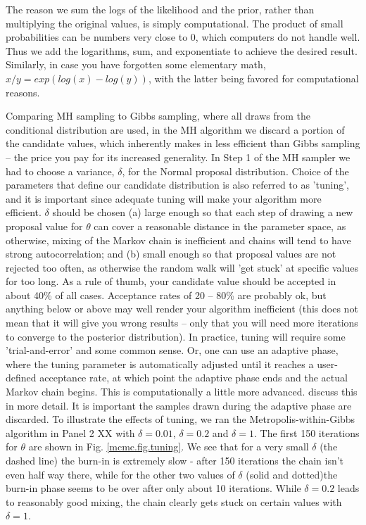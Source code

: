 The reason we sum the logs of the likelihood and the prior, rather than multiplying the original values, is simply computational. The product of small probabilities can be numbers very close to 0, which computers do not handle well. Thus we add the logarithms, sum, and exponentiate to achieve the desired result. Similarly, in case you have forgotten some elementary math, $x/y = exp(log(x)-log(y))$, with the latter being favored for computational reasons.

Comparing MH sampling to Gibbs sampling, where all draws from the conditional distribution are used, in the MH algorithm we discard a portion of the candidate values, which inherently makes in less efficient than Gibbs sampling – the price you pay for its increased generality.
In Step 1 of the MH sampler we had to choose a variance, $\delta$, for the Normal proposal distribution. Choice of the parameters that define our candidate distribution is also referred to as 'tuning', and it is important since adequate tuning will make your algorithm more efficient. 
$\delta$ should be chosen (a) large enough so that each step of drawing a new proposal value for $\theta$ can cover a reasonable distance in the parameter space, as otherwise, mixing of the Markov chain is inefficient and chains will tend to have strong autocorrelation; and (b) small enough so that proposal values are not rejected too often, as otherwise the random walk will 'get stuck' at specific values for too long.  As a rule of thumb, your candidate value should be accepted in about 40\% of all cases. Acceptance rates of 20 -- 80\% are probably ok, but anything below or above may well render your algorithm inefficient (this does not mean that it will give you wrong results – only that you will need more iterations to converge to the posterior distribution). In practice, tuning will require some 'trial-and-error' and some common sense. Or, one can use an adaptive phase, where the tuning parameter is automatically adjusted until it reaches a user-defined acceptance rate, at which point the adaptive phase ends and the actual Markov chain begins. This is computationally a little more advanced. \citet{link_barker:2009} discuss this in more detail. It is important the samples drawn during the adaptive phase are discarded.
To illustrate the effects of tuning, we ran the Metropolis-within-Gibbs algorithm in Panel 2 XX with $\delta=0.01$, $\delta=0.2$ and $\delta=1$. The first 150 iterations for $\theta$ are shown in Fig. \ref{mcmc.fig.tuning}. We see that for a very small $\delta$ (the dashed line) the burn-in is extremely slow - after 150 iterations the chain isn't even half way there, while for the other two values of $\delta$ (solid and dotted)the burn-in phase seems to be over after only about 10 iterations. While $\delta=0.2$ leads to reasonably good mixing, the chain clearly gets stuck on certain values with $\delta=1$.
